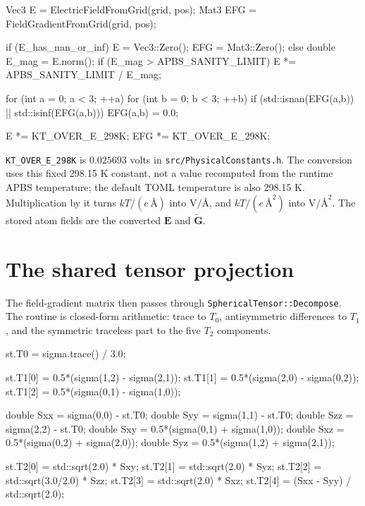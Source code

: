 \documentclass[11pt]{article}
\newcommand{\code}[1]{\texttt{#1}}
\begin{document}
\begin{codebox}
Vec3 E = ElectricFieldFromGrid(grid, pos);
Mat3 EFG = FieldGradientFromGrid(grid, pos);

if (E_has_nan_or_inf) {
    E = Vec3::Zero();
    EFG = Mat3::Zero();
} else {
    double E_mag = E.norm();
    if (E_mag > APBS_SANITY_LIMIT)
        E *= APBS_SANITY_LIMIT / E_mag;
}

for (int a = 0; a < 3; ++a)
    for (int b = 0; b < 3; ++b)
        if (std::isnan(EFG(a,b)) || std::isinf(EFG(a,b)))
            EFG(a,b) = 0.0;

E   *= KT_OVER_E_298K;
EFG *= KT_OVER_E_298K;
\end{codebox}

\code{KT\_OVER\_E\_298K} is \(0.025693\) volts in
\code{src/PhysicalConstants.h}. The conversion uses this fixed 298.15 K
constant, not a value recomputed from the runtime APBS temperature; the default
TOML temperature is also 298.15 K. Multiplication by it turns
\(kT/(e\,\si{\angstrom})\) into \(\si{\volt\per\angstrom}\), and
\(kT/(e\,\si{\angstrom\squared})\) into
\(\si{\volt\per\angstrom\squared}\). The stored atom fields are the converted
\(\bm E\) and \(\widetilde{\bm G}\).

\section{The shared tensor projection}

The field-gradient matrix then passes through
\code{SphericalTensor::Decompose}. The routine is closed-form arithmetic:
trace to \(T_0\), antisymmetric differences to \(T_1\), and the symmetric
traceless part to the five \(T_2\) components.

\begin{codebox}
st.T0 = sigma.trace() / 3.0;

st.T1[0] = 0.5*(sigma(1,2) - sigma(2,1));
st.T1[1] = 0.5*(sigma(2,0) - sigma(0,2));
st.T1[2] = 0.5*(sigma(0,1) - sigma(1,0));

double Sxx = sigma(0,0) - st.T0;
double Syy = sigma(1,1) - st.T0;
double Szz = sigma(2,2) - st.T0;
double Sxy = 0.5*(sigma(0,1) + sigma(1,0));
double Sxz = 0.5*(sigma(0,2) + sigma(2,0));
double Syz = 0.5*(sigma(1,2) + sigma(2,1));

st.T2[0] = std::sqrt(2.0)     * Sxy;
st.T2[1] = std::sqrt(2.0)     * Syz;
st.T2[2] = std::sqrt(3.0/2.0) * Szz;
st.T2[3] = std::sqrt(2.0)     * Sxz;
st.T2[4] = (Sxx - Syy) / std::sqrt(2.0);
\end{codebox}
\end{document}
